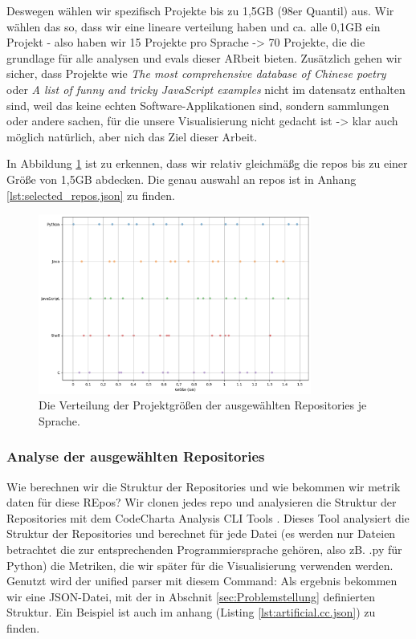 Deswegen wählen wir spezifisch Projekte bis zu 1,5GB (98er Quantil) aus. Wir wählen das so, dass wir eine lineare verteilung haben und ca. alle 0,1GB ein Projekt - also haben wir 15 Projekte pro Sprache -> 70 Projekte, die die grundlage für alle analysen und evals dieser ARbeit bieten. 
Zusätzlich gehen wir sicher, dass Projekte  wie \textit{The most comprehensive database of Chinese poetry} oder \textit{A list of funny and tricky JavaScript examples} nicht im datensatz enthalten sind, weil das keine echten Software-Applikationen sind, sondern sammlungen oder andere sachen, für die unsere Visualisierung nicht gedacht ist -> klar auch möglich natürlich, aber nich das Ziel dieser Arbeit.

In Abbildung \ref{fig:repoGroesseVerteilung} ist zu erkennen, dass wir relativ gleichmäßg die repos bis zu einer Größe von 1,5GB abdecken.  Die genau auswahl an repos ist in Anhang \ref{lst:selected_repos.json} zu finden.
\begin{figure}
    \centering
    \includegraphics[width=0.8\textwidth]{images/datenanalyse/repoGrößeVerteilung.png}
    \caption{Die Verteilung der Projektgrößen der ausgewählten Repositories je Sprache.}
    \label{fig:repoGroesseVerteilung}
\end{figure}

\subsubsection{Analyse der ausgewählten Repositories} \label{sec:analyseDerAusgewähltenRepositories}
Wie berechnen wir die Struktur der Repositories und wie bekommen wir metrik daten für diese REpos?
Wir clonen jedes repo und analysieren die Struktur der Repositories mit dem CodeCharta Analysis CLI Tools \cite{code_charta_wiki_ana}. Dieses Tool analysiert die Struktur der Repositories und berechnet für jede Datei (es werden nur Dateien betrachtet die zur entsprechenden Programmiersprache gehören, also zB. .py für Python) die Metriken, die wir später für die Visualisierung verwenden werden. Genutzt wird der unified parser mit diesem Command:
Als ergebnis bekommen wir eine JSON-Datei, mit der in Abschnit \ref{sec:Problemstellung} definierten Struktur. Ein Beispiel ist auch im anhang (Listing \ref{lst:artificial.cc.json}) zu finden.

